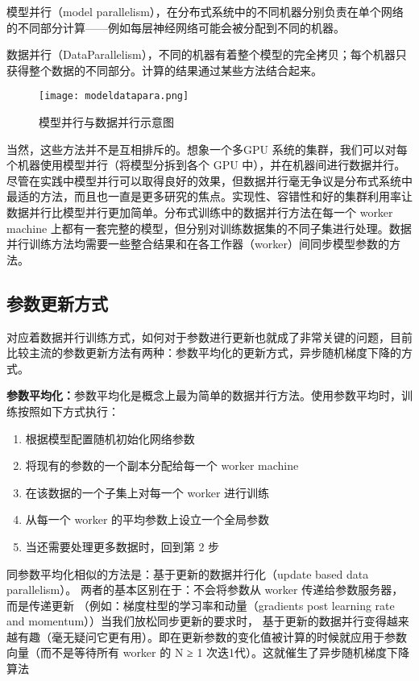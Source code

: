 模型并行（model parallelism），在分布式系统中的不同机器分别负责在单个网络的不同部分计算——例如每层神经网络可能会被分配到不同的机器。

数据并行（DataParallelism），不同的机器有着整个模型的完全拷贝；每个机器只获得整个数据的不同部分。计算的结果通过某些方法结合起来。
\begin{figure}[!ht]
 \centering
	\texttt{[image: modeldatapara.png]}
	\caption{模型并行与数据并行示意图}
\end{figure}

当然，这些方法并不是互相排斥的。想象一个多GPU 系统的集群，我们可以对每个机器使用模型并行（将模型分拆到各个 GPU 中），并在机器间进行数据并行。
尽管在实践中模型并行可以取得良好的效果，但数据并行毫无争议是分布式系统中最适的方法，而且也一直是更多研究的焦点。实现性、容错性和好的集群利用率让数据并行比模型并行更加简单。分布式训练中的数据并行方法在每一个 worker machine 上都有一套完整的模型，但分别对训练数据集的不同子集进行处理。数据并行训练方法均需要一些整合结果和在各工作器（worker）间同步模型参数的方法。

\subsection{参数更新方式}
对应着数据并行训练方式，如何对于参数进行更新也就成了非常关键的问题，目前比较主流的参数更新方法有两种：参数平均化的更新方式，异步随机梯度下降的方式。

\textbf{参数平均化：}参数平均化是概念上最为简单的数据并行方法。使用参数平均时，训练按照如下方式执行：
\begin{enumerate}
\item 根据模型配置随机初始化网络参数
\item 将现有的参数的一个副本分配给每一个 worker machine
\item 在该数据的一个子集上对每一个 worker 进行训练
\item 从每一个 worker 的平均参数上设立一个全局参数
\item 当还需要处理更多数据时，回到第 2 步
\end{enumerate}

同参数平均化相似的方法是：基于更新的数据并行化（update based data parallelism）。
两者的基本区别在于：不会将参数从 worker 传递给参数服务器，而是传递更新
（例如：梯度柱型的学习率和动量（gradients post learning rate and momentum））当我们放松同步更新的要求时，
基于更新的数据并行变得越来越有趣（毫无疑问它更有用）。即在更新参数的变化值被计算的时候就应用于参数向量（而不是等待所有 worker 的 N ≥ 1 次迭1代）。这就催生了异步随机梯度下降算法

